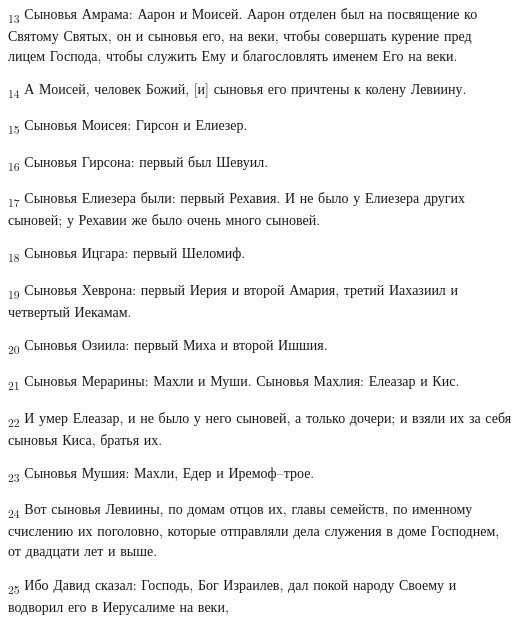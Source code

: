 \begin{tcolorbox}
\textsubscript{13} Сыновья Амрама: Аарон и Моисей. Аарон отделен был на посвящение ко Святому Святых, он и сыновья его, на веки, чтобы совершать курение пред лицем Господа, чтобы служить Ему и благословлять именем Его на веки.
\end{tcolorbox}
\begin{tcolorbox}
\textsubscript{14} А Моисей, человек Божий, [и] сыновья его причтены к колену Левиину.
\end{tcolorbox}
\begin{tcolorbox}
\textsubscript{15} Сыновья Моисея: Гирсон и Елиезер.
\end{tcolorbox}
\begin{tcolorbox}
\textsubscript{16} Сыновья Гирсона: первый был Шевуил.
\end{tcolorbox}
\begin{tcolorbox}
\textsubscript{17} Сыновья Елиезера были: первый Рехавия. И не было у Елиезера других сыновей; у Рехавии же было очень много сыновей.
\end{tcolorbox}
\begin{tcolorbox}
\textsubscript{18} Сыновья Ицгара: первый Шеломиф.
\end{tcolorbox}
\begin{tcolorbox}
\textsubscript{19} Сыновья Хеврона: первый Иерия и второй Амария, третий Иахазиил и четвертый Иекамам.
\end{tcolorbox}
\begin{tcolorbox}
\textsubscript{20} Сыновья Озиила: первый Миха и второй Ишшия.
\end{tcolorbox}
\begin{tcolorbox}
\textsubscript{21} Сыновья Мерарины: Махли и Муши. Сыновья Махлия: Елеазар и Кис.
\end{tcolorbox}
\begin{tcolorbox}
\textsubscript{22} И умер Елеазар, и не было у него сыновей, а только дочери; и взяли их за себя сыновья Киса, братья их.
\end{tcolorbox}
\begin{tcolorbox}
\textsubscript{23} Сыновья Мушия: Махли, Едер и Иремоф--трое.
\end{tcolorbox}
\begin{tcolorbox}
\textsubscript{24} Вот сыновья Левиины, по домам отцов их, главы семейств, по именному счислению их поголовно, которые отправляли дела служения в доме Господнем, от двадцати лет и выше.
\end{tcolorbox}
\begin{tcolorbox}
\textsubscript{25} Ибо Давид сказал: Господь, Бог Израилев, дал покой народу Своему и водворил его в Иерусалиме на веки,
\end{tcolorbox}
